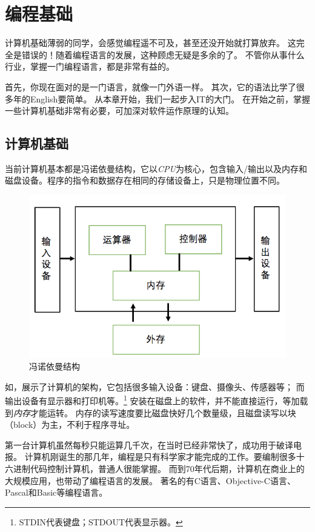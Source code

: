 \chapter{编程基础}
\label{chap:java_datatype}

计算机基础薄弱的同学，会感觉编程遥不可及，甚至还没开始就打算放弃。
这完全是错误的！随着编程语言的发展，这种顾虑无疑是多余的了。
不管你从事什么行业，掌握一门编程语言，都是非常有益的。

首先，你现在面对的是一门语言，就像一门外语一样。
其次，它的语法比学了很多年的English要简单。
从本章开始，我们一起步入IT的大门。
在开始之前，掌握一些计算机基础非常有必要，可加深对软件运作原理的认知。

\section{计算机基础}
当前计算机基本都是冯诺依曼结构，它以\emph{CPU}为核心，包含输入/输出以及内存和磁盘设备。程序的指令和数据存在相同的存储设备上，只是物理位置不同。

\begin{figure}[!htb]
\centerline{\includegraphics[width=.3\figwidth]{images/von_neumann.png}}
\caption{冯诺依曼结构}
\label{fig:part1_von_neumann}
\end{figure}

\noindent
如，展示了计算机的架构，它包括很多输入设备：键盘、摄像头、传感器等；
而输出设备有显示器和打印机等。\footnote{STDIN代表键盘；STDOUT代表显示器。}
安装在磁盘上的软件，并不能直接运行，等加载到\emph{内存}才能运转。
内存的读写速度要比磁盘快好几个数量级，且磁盘读写以块（block）为主，不利于程序寻址。

第一台计算机虽然每秒只能运算几千次，在当时已经非常快了，成功用于破译电报。
计算机刚诞生的那几年，编程是只有科学家才能完成的工作。要编制很多十六进制代码控制计算机，普通人很能掌握。
而到70年代后期，计算机在商业上的大规模应用，也带动了编程语言的发展。
著名的有C语言、Objective-C语言、Pascal和Basic等编程语言。

